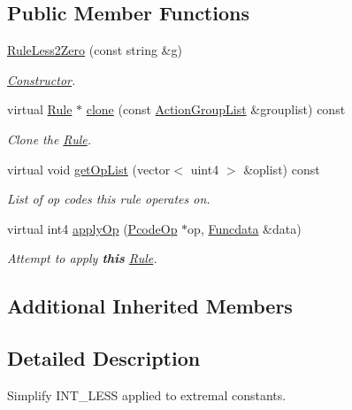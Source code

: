 \subsection*{Public Member Functions}
\begin{DoxyCompactItemize}
\item 
\mbox{\hyperlink{class_rule_less2_zero_a4b2b01edd91cf591fe3c4b3c59579a85}{Rule\+Less2\+Zero}} (const string \&g)
\begin{DoxyCompactList}\small\item\em \mbox{\hyperlink{class_constructor}{Constructor}}. \end{DoxyCompactList}\item 
virtual \mbox{\hyperlink{class_rule}{Rule}} $\ast$ \mbox{\hyperlink{class_rule_less2_zero_a586bf16d8b5f4d60990d3594ad2a0b87}{clone}} (const \mbox{\hyperlink{class_action_group_list}{Action\+Group\+List}} \&grouplist) const
\begin{DoxyCompactList}\small\item\em Clone the \mbox{\hyperlink{class_rule}{Rule}}. \end{DoxyCompactList}\item 
virtual void \mbox{\hyperlink{class_rule_less2_zero_a223d890a5acce68c2711cc71279f6d2b}{get\+Op\+List}} (vector$<$ uint4 $>$ \&oplist) const
\begin{DoxyCompactList}\small\item\em List of op codes this rule operates on. \end{DoxyCompactList}\item 
virtual int4 \mbox{\hyperlink{class_rule_less2_zero_ac9d89e7b8899c76a40f88b3b0a5a0d74}{apply\+Op}} (\mbox{\hyperlink{class_pcode_op}{Pcode\+Op}} $\ast$op, \mbox{\hyperlink{class_funcdata}{Funcdata}} \&data)
\begin{DoxyCompactList}\small\item\em Attempt to apply {\bfseries{this}} \mbox{\hyperlink{class_rule}{Rule}}. \end{DoxyCompactList}\end{DoxyCompactItemize}
\subsection*{Additional Inherited Members}


\subsection{Detailed Description}
Simplify I\+N\+T\+\_\+\+L\+E\+SS applied to extremal constants. 

